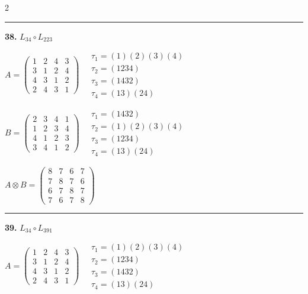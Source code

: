 \begin{multicols}{2}
\vspace{0.3em}
\hrule
\vspace{0.3em}

\noindent\textbf{38.} $L_{34} \circ L_{223}$

$A = \begin{pmatrix} 1 & 2 & 4 & 3 \\ 3 & 1 & 2 & 4 \\ 4 & 3 & 1 & 2 \\ 2 & 4 & 3 & 1 \end{pmatrix} \quad \begin{matrix} \tau_{1}=(1)(2)(3)(4) \\ \tau_{2}=(1 2 3 4) \\ \tau_{3}=(1 4 3 2) \\ \tau_{4}=(1 3)(2 4) \end{matrix}$

$B = \begin{pmatrix} 2 & 3 & 4 & 1 \\ 1 & 2 & 3 & 4 \\ 4 & 1 & 2 & 3 \\ 3 & 4 & 1 & 2 \end{pmatrix} \quad \begin{matrix} \tau_{1}=(1 4 3 2) \\ \tau_{2}=(1)(2)(3)(4) \\ \tau_{3}=(1 2 3 4) \\ \tau_{4}=(1 3)(2 4) \end{matrix}$

$A \otimes B = \begin{pmatrix} 8 & 7 & 6 & 7 \\ 7 & 8 & 7 & 6 \\ 6 & 7 & 8 & 7 \\ 7 & 6 & 7 & 8 \end{pmatrix}$

\vspace{0.3em}
\hrule
\vspace{0.3em}

\noindent\textbf{39.} $L_{34} \circ L_{391}$

$A = \begin{pmatrix} 1 & 2 & 4 & 3 \\ 3 & 1 & 2 & 4 \\ 4 & 3 & 1 & 2 \\ 2 & 4 & 3 & 1 \end{pmatrix} \quad \begin{matrix} \tau_{1}=(1)(2)(3)(4) \\ \tau_{2}=(1 2 3 4) \\ \tau_{3}=(1 4 3 2) \\ \tau_{4}=(1 3)(2 4) \end{matrix}$


\end{multicols}
